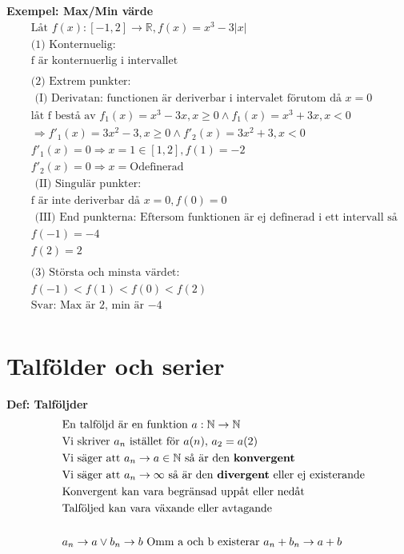 \textbf{Exempel: Max/Min värde}
\begin{align*}
  &\quad  \text{Låt } f(x):[-1,2]\to\mathbb{R}, f(x)=x^3-3|x|  \\
  &\quad  \text{(1) Konternuelig: } \\
  &\quad  \text{f är konternuerlig i intervallet}   \\
  &\quad  \\
  &\quad  \text{(2) Extrem punkter: }   \\
  &\quad  \text{ (I) Derivatan: functionen är deriverbar i intervalet förutom då } x=0 \\
  &\quad  \text{låt f bestå av } f_1(x)=x^3-3x, x \geq 0 \land f_1(x)=x^3+3x, x<0 \\
  &\quad  \Rightarrow f'_1(x)=3x^2-3, x \geq 0 \land f'_2(x)=3x^2+3, x<0 \\
  &\quad   f'_1(x)=0 \Rightarrow x=1 \in [1,2], f(1)=-2  \\
  &\quad   f'_2(x)=0 \Rightarrow x= \text{Odefinerad} \\
  &\quad  \text{ (II) Singulär punkter:} \\
  &\quad  \text{f är inte deriverbar då } x=0, f(0)=0 \\
  &\quad  \text{ (III) End punkterna: Eftersom funktionen är ej definerad i ett intervall så finns det inga } \\
  &\quad  f(-1)=-4 \\
  &\quad  f(2) = 2 \\
  &\quad  \\
  &\quad  \text{(3) Största och minsta värdet: } \\
  &\quad  f(-1)<f(1)<f(0)<f(2)  \\
  &\quad  \text{Svar: Max är $2$, min är $-4$}  \\
\end{align*}


\newpage


\section{Talfölder och serier}
\textbf{Def: Talföljder}
\begin{align*}
  &\quad  \text{En talföljd är en funktion } a:\mathbb{N}\to\mathbb{N}  \\
  &\quad  \text{Vi skriver $a_n$ istället för $a(n)$, $a_2=a(2)$} \\
  &\quad  \text{Vi säger att $a_n\to{a}\in\mathbb{N}$ så är den \textbf{konvergent}} \\
  &\quad  \text{Vi säger att $a_n\to\infty$ så är den \textbf{divergent} eller ej existerande} \\
  &\quad  \text{Konvergent kan vara begränsad uppåt eller nedåt} \\
  &\quad  \text{Talföljed kan vara växande eller avtagande} \\
  &\quad  \\
  &\quad  a_n\to{a}\lor{b_n\to{b}} \text{ Omm a och b existerar } a_n+b_n\to{a+b} \\
\end{align*}

